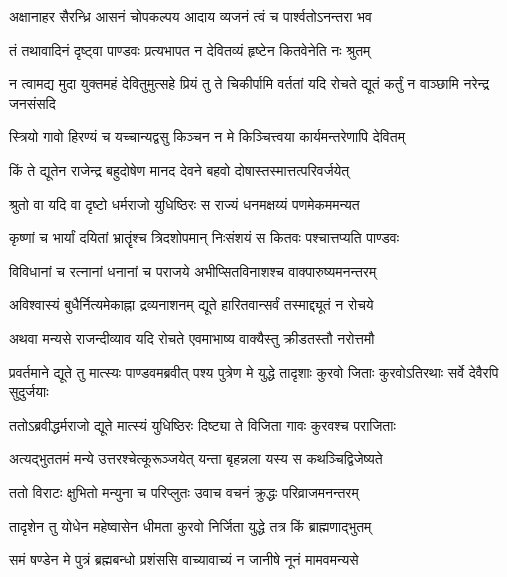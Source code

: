 \twolineshloka
{अक्षानाहर सैरन्ध्रि आसनं चोपकल्पय}
{आदाय व्यजनं त्वं च पार्श्वतोऽनन्तरा भव}


\twolineshloka
{तं तथावादिनं दृष्ट्वा पाण्डवः प्रत्यभापत}
{न देवितव्यं हृष्टेन कितवेनेति नः श्रुतम्}


\threelineshloka
{न त्वामद्य मुदा युक्तमहं देवितुमुत्सहे}
{प्रियं तु ते चिकीर्पामि वर्ततां यदि रोचते}
{द्यूतं कर्तुं न वाञ्छामि नरेन्द्र जनसंसदि}




\twolineshloka
{स्त्रियो गावो हिरण्यं च यच्चान्यद्वसु किञ्चन}
{न मे किञ्चित्त्वया कार्यमन्तरेणापि देवितम्}




\twolineshloka
{किं ते द्यूतेन राजेन्द्र बहुदोषेण मानद}
{देवने बहवो दोषास्तस्मात्तत्परिवर्जयेत्}


\twolineshloka
{श्रुतो वा यदि वा दृष्टो धर्मराजो युधिष्ठिरः}
{स राज्यं धनमक्षय्यं पणमेकममन्यत}


\twolineshloka
{कृष्णां च भार्यां दयितां भ्रातॄंश्च त्रिदशोपमान्}
{निःसंशयं स कितवः पश्चात्तप्यति पाण्डवः}


\twolineshloka
{विविधानां च रत्नानां धनानां च पराजये}
{अभीप्सितविनाशश्च वाक्पारुष्यमनन्तरम्}


\twolineshloka
{अविश्वास्यं बुधैर्नित्यमेकाह्ना द्रव्यनाशनम्}
{द्यूते हारितवान्सर्वं तस्माद्द्यूतं न रोचये}


\twolineshloka
{अथवा मन्यसे राजन्दीव्याव यदि रोचते}
{एवमाभाष्य वाक्यैस्तु क्रीडतस्तौ नरोत्तमौ}


\onelineshloka
{प्रवर्तमाने द्यूते तु मात्स्यः पाण्डवमब्रवीत्}
\twolineshloka
{पश्य पुत्रेण मे युद्धे तादृशाः कुरवो जिताः}
{कुरवोऽतिरथाः सर्वे देवैरपि सुदुर्जयाः}


\twolineshloka
{ततोऽब्रवीद्धर्मराजो द्यूते मात्स्यं युधिष्ठिरः}
{दिष्ट्या ते विजिता गावः कुरवश्च पराजिताः}


\twolineshloka
{अत्यद्भुततमं मन्ये उत्तरश्चेत्कूरूञ्जयेत्}
{यन्ता बृहन्नला यस्य स कथञ्चिद्विजेष्यते}


\twolineshloka
{ततो विराटः क्षुभितो मन्युना च परिप्लुतः}
{उवाच वचनं क्रुद्धः परिव्राजमनन्तरम्}


\twolineshloka
{तादृशेन तु योधेन महेष्वासेन धीमता}
{कुरवो निर्जिता युद्धे तत्र किं ब्राह्मणाद्भुतम्}




\twolineshloka
{समं षण्डेन मे पुत्रं ब्रह्मबन्धो प्रशंससि}
{वाच्यावाच्यं न जानीषे नूनं मामवमन्यसे}

